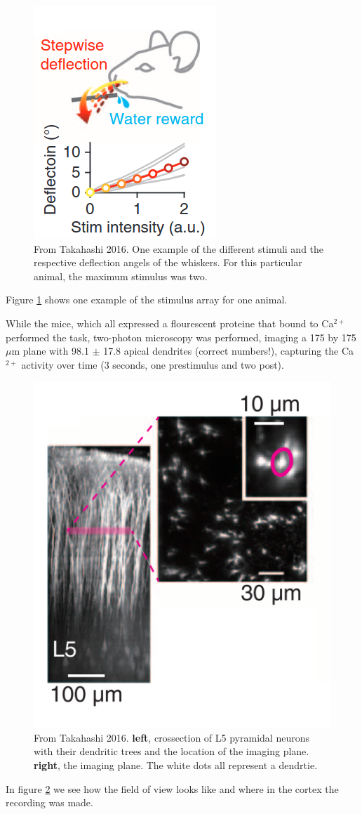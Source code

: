 \documentclass[
10pt, %
a4paper, %
oneside, %
headinclude,footinclude, %
BCOR5mm, %
]{scrartcl}
\begin{document}
\begin{figure}[tb]
\centering 
\includegraphics[width=0.5\columnwidth]{mouse.png} 
\caption[BAC Firing]{From Takahashi 2016. One example of the different stimuli and the respective deflection angels of the whiskers. For this particular animal, the maximum stimulus was two.} %
\label{fig:mouse} 
\end{figure}

Figure \ref{fig:mouse} shows one example of the stimulus array for one animal.

While the mice, which all expressed a flourescent proteine that bound to Ca$^{2+}$ performed the task, two-photon microscopy was performed, imaging a 175 by 175 $\mu$m plane with 98.1 $\pm$ 17.8 apical dendrites (correct numbers!), capturing the Ca$^{2+}$ activity over time (3 seconds, one prestimulus and two post).
\begin{figure}[tb]
\centering 
\includegraphics[width=0.5\columnwidth]{roi.png} 
\caption[BAC Firing]{From Takahashi 2016. \textbf{left}, crossection of L5 pyramidal neurons with their dendritic trees and the location of the imaging plane. \textbf{right}, the imaging plane. The white dots all represent a dendrtie.} %
\label{fig:roi} 
\end{figure}
In figure \ref{fig:roi} we see how the field of view looks like and where in the cortex the recording was made.
\end{document}
